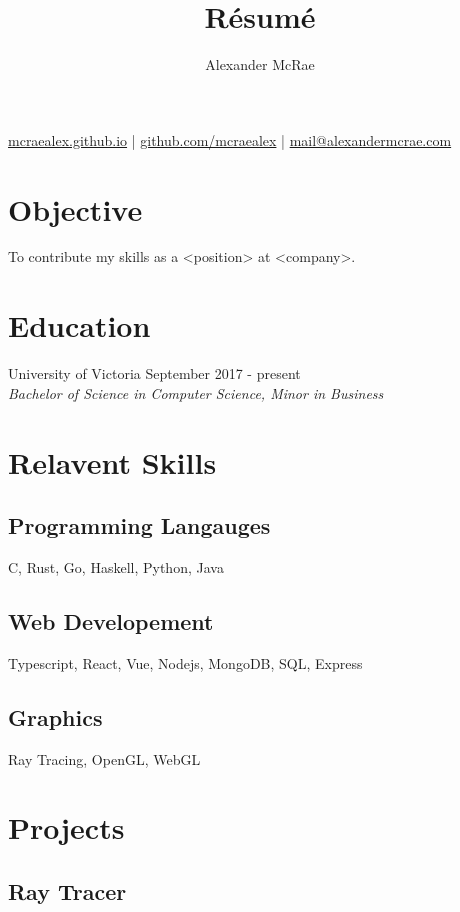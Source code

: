 \documentclass{article}
\makeatletter
\renewcommand{\maketitle}{
\begin{center}
{\huge \bfseries \theauthor}

\vspace{0.25em}
\url{mcraealex.github.io} | \url{github.com/mcraealex} | \href{mailto:mail@alexandermcrae.com}{mail@alexandermcrae.com}
\end{center}}
\newcommand{\hrefColored}[3]{\href{#2}{\color{#1}{#3}}}
\makeatother
\begin{document}
\title{R\'esum\'e}
\author{Alexander McRae}

\maketitle

\section{Objective}

\noindent To contribute my skills as a <position> at <company>.

\section{Education}

\noindent University of Victoria \hfill September 2017 - present\\
\textit{Bachelor of Science in Computer Science, Minor in Business}

\section{Relavent Skills}

\subsection{Programming Langauges}

C, Rust, Go, Haskell, Python, Java

\subsection{Web Developement}

Typescript, React, Vue, Nodejs, MongoDB, SQL, Express

\subsection{Graphics}

Ray Tracing, OpenGL, WebGL

\section{Projects}

\subsection{Ray Tracer \hrefColored{blue}{https://github.com/McRaeAlex/tiny-raytracer}{github.com/McRaeAlex/tiny-raytracer}}
\end{document}

